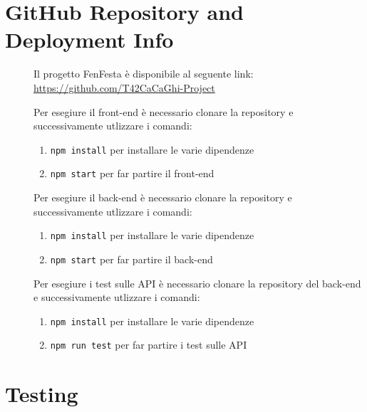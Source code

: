 \documentclass{article}
\begin{document}
\section{GitHub Repository and Deployment Info}
\begin{description}
    \item[] Il progetto FenFesta è disponibile al seguente link: \url{https://github.com/T42CaCaGhi-Project}
    \item[] Per esegiure il front-end è necessario clonare la repository e successivamente utlizzare i comandi:
        \begin{enumerate}
            \item \texttt{npm install} per installare le varie dipendenze
            \item \texttt{npm start} per far partire il front-end
        \end{enumerate}
    \item[] Per esegiure il back-end è necessario clonare la repository e successivamente utlizzare i comandi:
        \begin{enumerate}
            \item \texttt{npm install} per installare le varie dipendenze
            \item \texttt{npm start} per far partire il back-end
        \end{enumerate}
    \item[] Per esegiure i test sulle API è necessario clonare la repository del back-end e successivamente utlizzare i comandi:
        \begin{enumerate}
            \item \texttt{npm install} per installare le varie dipendenze
            \item \texttt{npm run test} per far partire i test sulle API
        \end{enumerate}
\end{description}
\clearpage
\section{Testing}
\begin{description}
    \item[]
\end{description}
\end{document}
